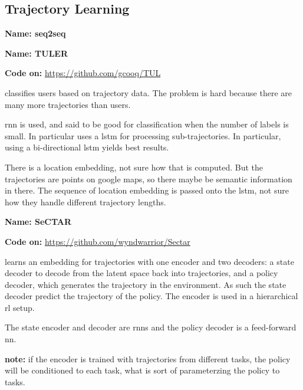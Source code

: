 \subsection{Trajectory Learning}\label{sec: traj learning}



\textbf{Name: seq2seq}

\cite{sutskever2014sequence}


\textbf{Name: TULER}

\textbf{Code on:} \url{https://github.com/gcooq/TUL}

\cite{gao2017identifying} classifies users based on trajectory data. The problem is hard because there are many more trajectories than users.

\gls{rnn} is used, and said to be good for classification when the number of labels is small. In particular uses a \gls{lstm} for processing sub-trajectories.
%
In particular, using a bi-directional \gls{lstm} yields best results. 

There is a location embedding, not sure how that is computed. But the trajectories are points on google maps, so there maybe be semantic information in there.
%
The sequence of location embedding is passed onto the \gls{lstm}, not sure how they handle different trajectory lengths.



\textbf{Name: SeCTAR}

\textbf{Code on:} \url{https://github.com/wyndwarrior/Sectar}

\cite{co2018self} learns an embedding for trajectories with one encoder and two decoders: a state decoder to decode from the latent space back into trajectories, and a policy decoder, which generates the trajectory in the environment. As such the state decoder predict the trajectory of the policy. The encoder is used in a hierarchical \gls{rl} setup.

The state encoder and decoder are \glspl{rnn} and the policy decoder is a feed-forward \gls{nn}.

\textbf{note:} if the encoder is trained with trajectories from different tasks, the policy will be conditioned to each task, what is sort of parameterzing the policy to tasks. 

